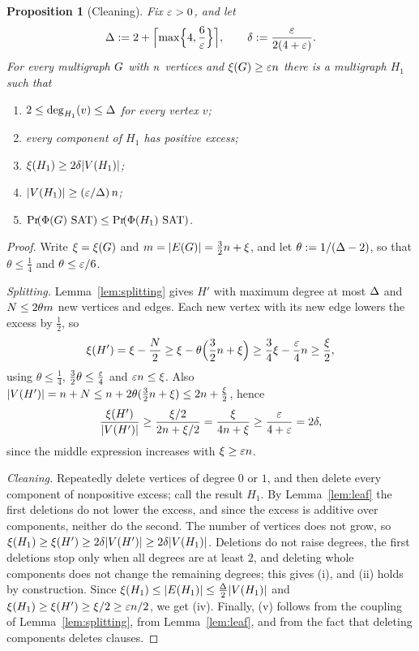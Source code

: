 \documentclass[11pt,a4paper]{article}
\newtheorem{proposition}[theorem]{Proposition}
\theoremstyle{definition}
\theoremstyle{remark}
\theoremstyle{plain}
\theoremstyle{definition}
\begin{document}
\begin{proposition}[Cleaning]\label{prop:cleaning}
Fix \(\varepsilon>0\), and let
\[
  \Delta:=2+\Bigl\lceil\max\Bigl\{4,\frac6{\varepsilon}\Bigr\}\Bigr\rceil,
  \qquad
  \delta:=\frac{\varepsilon}{2(4+\varepsilon)} .
\]
For every multigraph \(G\) with \(n\) vertices and \(\xi(G)\ge\varepsilon n\)
there is a multigraph \(H_1\) such that
\begin{enumerate}[label=(\roman*)]
\item \(2\le\deg_{H_1}(v)\le\Delta\) for every vertex \(v\);
\item every component of \(H_1\) has positive excess;
\item \(\xi(H_1)\ge2\delta|V(H_1)|\);
\item \(|V(H_1)|\ge(\varepsilon/\Delta)\,n\);
\item \(\Prx{\rform{\Gin}\SAT}\le\Prx{\rform{H_1}\SAT}\).
\end{enumerate}
\end{proposition}

\begin{proof}
Write \(\xi=\xi(G)\) and \(m=|E(G)|=\frac32n+\xi\), and let
\(\theta:=1/(\Delta-2)\), so that \(\theta\le\frac14\) and
\(\theta\le\varepsilon/6\).

\emph{Splitting.} Lemma~\ref{lem:splitting} gives \(H'\) with maximum degree
at most \(\Delta\) and \(N\le2\theta m\) new vertices and edges. Each new
vertex with its new edge lowers the excess by \(\frac12\), so
\[
  \xi(H')=\xi-\frac N2\ge\xi-\theta\Bigl(\frac32n+\xi\Bigr)
  \ge\frac34\xi-\frac{\varepsilon}4n\ge\frac\xi2,
\]
using \(\theta\le\frac14\), \(\frac32\theta\le\frac{\varepsilon}4\) and
\(\varepsilon n\le\xi\). Also
\(|V(H')|=n+N\le n+2\theta(\frac32n+\xi)\le2n+\frac\xi2\), hence
\[
  \frac{\xi(H')}{|V(H')|}\ge\frac{\xi/2}{2n+\xi/2}=\frac{\xi}{4n+\xi}
  \ge\frac{\varepsilon}{4+\varepsilon}=2\delta ,
\]
since the middle expression increases with \(\xi\ge\varepsilon n\).

\emph{Cleaning.} Repeatedly delete vertices of degree \(0\) or \(1\), and then
delete every component of nonpositive excess; call the result \(H_1\). By
Lemma~\ref{lem:leaf} the first deletions do not lower the excess, and since the
excess is additive over components, neither do the second. The number of
vertices does not grow, so
\(\xi(H_1)\ge\xi(H')\ge2\delta|V(H')|\ge2\delta|V(H_1)|\). Deletions do not
raise degrees, the first deletions stop only when all degrees are at least
\(2\), and deleting whole components does not change the remaining degrees;
this gives (i), and (ii) holds by construction. Since
\(\xi(H_1)\le|E(H_1)|\le\frac{\Delta}2|V(H_1)|\) and
\(\xi(H_1)\ge\xi(H')\ge\xi/2\ge\varepsilon n/2\), we get (iv). Finally, (v)
follows from the coupling of Lemma~\ref{lem:splitting}, from
Lemma~\ref{lem:leaf}, and from the fact that deleting components deletes
clauses.
\end{proof}
\end{document}
